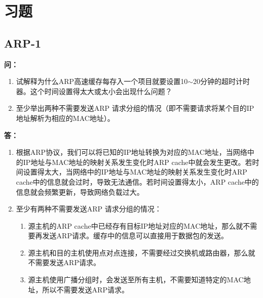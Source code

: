 \documentclass[12pt,hyperref,a4paper,UTF8]{ctexart}
\begin{document}
\cover
\thispagestyle{empty}%


\newpage
\tableofcontents

\newpage

\section{习题}

\subsection{ARP-1}
\textbf{问：}
\begin{enumerate}[label=\Roman*,leftmargin=2.2\parindent]
    \item 试解释为什么ARP高速缓存每存入一个项目就要设置10$\sim$20分钟的超时计时器。这个时间设置得太大或太小会出现什么问题？

    \item 至少举出两种不需要发送ARP 请求分组的情况（即不需要请求将某个目的IP地址解析为相应的MAC地址）。
\end{enumerate}

\textbf{答：}
\begin{enumerate}[label=\Roman*,leftmargin=2.2\parindent]
    \item 根据ARP协议，我们可以将已知的IP地址转换为对应的MAC地址，当网络中的IP地址与MAC地址的映射关系发生变化时ARP cache中就会发生更改。若时间设置得太大，当网络中的IP地址与MAC地址的映射关系发生变化时ARP cache中的信息就会过时，导致无法通信。若时间设置得太小，ARP cache中的信息就会频繁更新，导致网络负载过大。

    \item 至少有两种不需要发送ARP 请求分组的情况：
    \begin{enumerate}[label=(\alph*)]
        \item 源主机的ARP cache中已经存有目标IP地址对应的MAC地址，那么就不需要再发送ARP请求。缓存中的信息可以直接用于数据包的发送。
        \item 源主机和目的主机使用点对点连接，不需要经过交换机或路由器，那么就不需要发送ARP请求。
        \item 源主机使用广播分组时，会发送至所有主机，不需要知道特定的MAC地址，所以不需要发送ARP请求。
    \end{enumerate}
\end{enumerate}
\end{document}
